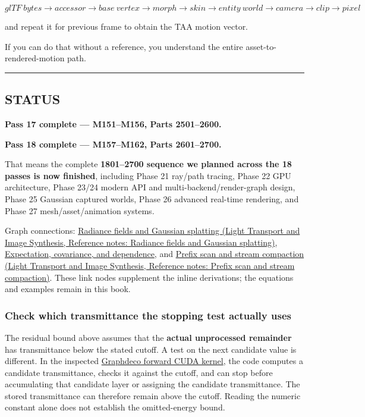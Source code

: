 \[
\boxed{
glTF\ bytes
\rightarrow
accessor
\rightarrow
base\ vertex
\rightarrow
morph
\rightarrow
skin
\rightarrow
entity\ world
\rightarrow
camera
\rightarrow
clip
\rightarrow
pixel
}
\]

and repeat it for previous frame to obtain the TAA motion vector.

If you can do that without a reference, you understand the entire asset-to-rendered-motion path.

\begin{center}\rule{0.5\linewidth}{0.5pt}\end{center}

\subsection{STATUS}\label{04-visual-computing-ii-ch041-status}

\textbf{Pass 17 complete --- M151--M156, Parts 2501--2600.}

\textbf{Pass 18 complete --- M157--M162, Parts 2601--2700.}

That means the complete \textbf{1801--2700 sequence we planned across the 18 passes is now finished}, including Phase 21 ray/path tracing, Phase 22 GPU architecture, Phase 23/24 modern API and multi-backend/render-graph design, Phase 25 Gaussian captured worlds, Phase 26 advanced real-time rendering, and Phase 27 mesh/asset/animation systems.

Graph connections: \href{../04-Light-Transport-and-Image-Synthesis/main.pdf\#nameddest=appendix-c5b332e400e7}{Radiance fields and Gaussian splatting (Light Transport and Image Synthesis, Reference notes: Radiance fields and Gaussian splatting)}, \hyperref[appendix-54c383df9992]{Expectation, covariance, and dependence}, and \href{../04-Light-Transport-and-Image-Synthesis/main.pdf\#nameddest=appendix-f2ee4d086415}{Prefix scan and stream compaction (Light Transport and Image Synthesis, Reference notes: Prefix scan and stream compaction)}. These link nodes supplement the inline derivations; the equations and examples remain in this book.

\subsubsection{Check which transmittance the stopping test actually uses}\label{04-visual-computing-ii-ch041-check-which-transmittance-the-stopping-test-actually-uses}

The residual bound above assumes that the \textbf{actual unprocessed remainder} has transmittance below the stated cutoff. A test on the next candidate value is different. In the inspected \href{https://github.com/graphdeco-inria/diff-gaussian-rasterization/blob/main/cuda_rasterizer/forward.cu}{Graphdeco forward CUDA kernel}, the code computes a candidate transmittance, checks it against the cutoff, and can stop before accumulating that candidate layer or assigning the candidate transmittance. The stored transmittance can therefore remain above the cutoff. Reading the numeric constant alone does not establish the omitted-energy bound.

